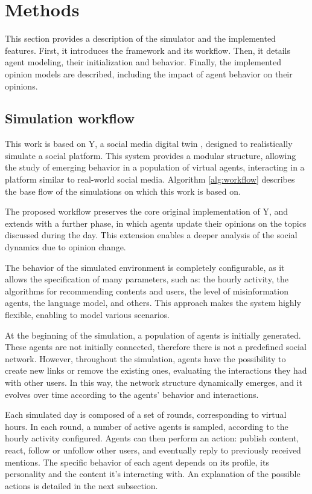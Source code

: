 \section{Methods}
\label{sec:methods}

This section provides a description of the simulator and the implemented features.
First, it introduces the framework and its workflow.
Then, it details agent modeling, their initialization and behavior.
Finally, the implemented opinion models are described, including the impact of agent behavior on their opinions.

\subsection{Simulation workflow}
This work is based on Y, a social media digital twin \cite{rossetti2024ysocialllmpoweredsocial}, designed to realistically simulate a social platform.
This system provides a modular structure, allowing the study of emerging behavior in a population of virtual agents, interacting in a platform similar to real-world social media.
Algorithm \ref{alg:workflow} describes the base flow of the simulations on which this work is based on.

\medskip
The proposed workflow preserves the core original implementation of Y, and extends with a further phase, in which agents update their opinions on the topics discussed during the day.
This extension enables a deeper analysis of the social dynamics due to opinion change.

The behavior of the simulated environment is completely configurable, as it allows the specification of many parameters, such as: the hourly activity, the algorithms for recommending contents and users, the level of misinformation agents, the language model, and others.
This approach makes the system highly flexible, enabling to model various scenarios.

\medskip
At the beginning of the simulation, a population of agents is initially generated.
These agents are not initially connected, therefore there is not a predefined social network.
However, throughout the simulation, agents have the possibility to create new links or remove the existing ones, evaluating the interactions they had with other users.
In this way, the network structure dynamically emerges, and it evolves over time according to the agents' behavior and interactions.

Each simulated day is composed of a set of rounds, corresponding to virtual hours.
In each round, a number of active agents is sampled, according to the hourly activity configured.
Agents can then perform an action: publish content, react, follow or unfollow other users, and eventually reply to previously received mentions.
The specific behavior of each agent depends on its profile, its personality and the content it's interacting with. 
An explanation of the possible actions is detailed in the next subsection.

